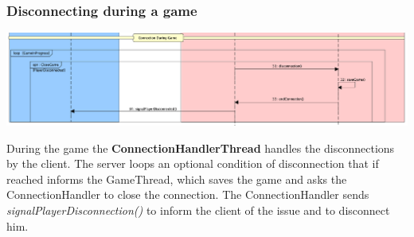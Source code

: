 \documentclass[12pt]{article}
\begin{document}
			\subsubsection{Disconnecting during a game}
			
			\begin{center}
				\includegraphics[width=\textwidth,height=\textheight,keepaspectratio]{Connection_5}
			\end{center}
			
			During the game the \textbf{ConnectionHandlerThread} handles the disconnections by the client. The server loops an optional condition of disconnection that if reached informs the GameThread, which saves the game and asks the ConnectionHandler to close the connection. The ConnectionHandler sends \emph{signalPlayerDisconnection()} to inform the client of the issue and to disconnect him.
			
\end{document}
